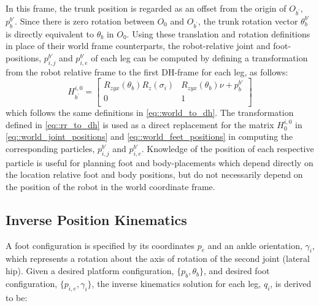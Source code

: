 			In this frame, the trunk position is regarded as an offset from the origin of $O_{b^{'}}$, $p_{b}^{b'}$. Since there is zero rotation between $O_{0}$ and $O_{b^{'}}$, the trunk rotation vector $\theta_{b}^{b'}$ is directly equivalent to $\theta_{b}$ in $O_{0}$. Using these translation and rotation definitions in place of their world frame counterparts, the robot-relative joint and foot-positions, ${p}_{i,j}^{b'}$ and ${p}_{i,e}^{b'}$ of each \Ith leg can be computed by defining a transformation from the robot relative frame to the first DH-frame for each leg, as follows:
				\begin{equation}
					H_{b^{'}}^{i,0} = 
					\left[ 
					\begin{array}{c|c}
						R_{zyx}(\theta_{b}) R_{z}(\sigma_{i})	&R_{zyx}(\theta_{b}) \nu + {p}_{b}^{b'} 	\\ \hline
						0										&	1												\\
					\end{array} 
					\right]
					\label{eq::rr_to_dh}
				\end{equation}
			which follows the same definitions in \ref{eq::world_to_dh}.
			The transformation defined in \ref{eq::rr_to_dh} is used as a direct replacement for the matrix $H_{0}^{i,0}$ in \ref{eq::world_joint_positions} and \ref{eq::world_feet_positions} in computing the corresponding particles, ${p}_{i,j}^{b'}$ and ${p}_{i,e}^{b'}$. Knowledge of the position of each respective particle is useful for planning foot and body-placements which depend directly on the location relative foot and body positions, but do not necessarily depend on the position of the robot in the world coordinate frame.
 

		\subsection{Inverse Position Kinematics}
			\label{sec::inverse_position_kinematics}
			
			A foot configuration is specified by its coordinates ${p}_{e}$ and an ankle orientation, $\gamma_{i}$,  which represents a rotation about the axis of rotation of the second joint (lateral hip). Given a desired platform configuration, $\{ {p}_{b}, \theta_{b} \}$,  and desired \Ith foot configuration,  $\{ {p}_{i,e} , \gamma_{i} \}$, the inverse kinematics solution for each \Ith leg, ${q}_{i}$, is derived to be:

